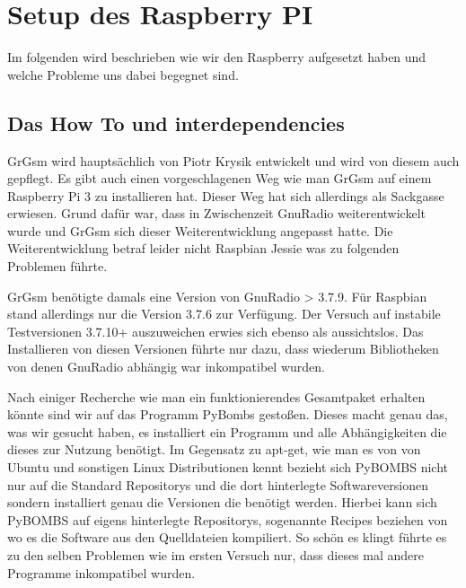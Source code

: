 %
%
\chapter{Setup des Raspberry PI}
Im folgenden wird beschrieben wie wir den Raspberry aufgesetzt haben und welche Probleme uns dabei begegnet sind.
\section{Das How To und interdependencies}

GrGsm wird hauptsächlich von Piotr Krysik entwickelt und wird von diesem auch gepflegt. Es gibt auch einen vorgeschlagenen Weg wie man GrGsm auf einem Raspberry Pi 3 zu installieren hat. Dieser Weg hat sich allerdings als Sackgasse erwiesen. Grund dafür war, dass in Zwischenzeit GnuRadio weiterentwickelt wurde und GrGsm sich dieser Weiterentwicklung angepasst hatte. Die Weiterentwicklung betraf leider nicht Raspbian Jessie was zu folgenden Problemen führte.

GrGsm benötigte damals eine Version von GnuRadio > 3.7.9. Für Raspbian stand allerdings nur die Version 3.7.6 zur Verfügung. Der Versuch auf instabile Testversionen 3.7.10+ auszuweichen erwies sich ebenso als aussichtslos. Das Installieren von diesen Versionen führte nur dazu, dass wiederum Bibliotheken von denen GnuRadio abhängig war inkompatibel wurden.

Nach einiger Recherche wie man ein funktionierendes Gesamtpaket erhalten könnte sind wir auf das Programm PyBombs gestoßen. Dieses macht genau das, was wir gesucht haben, es installiert ein Programm und alle Abhängigkeiten die dieses zur Nutzung benötigt. Im Gegensatz zu apt-get, wie man es von von Ubuntu und sonstigen Linux Distributionen kennt bezieht sich PyBOMBS nicht nur auf die Standard Repositorys und die dort hinterlegte Softwareversionen sondern installiert genau die Versionen die benötigt werden. Hierbei kann sich PyBOMBS auf eigens hinterlegte Repositorys, sogenannte Recipes beziehen von wo es die Software aus den Quelldateien kompiliert. 
So schön es klingt führte es zu den selben Problemen wie im ersten Versuch nur, dass dieses mal andere Programme inkompatibel wurden.


